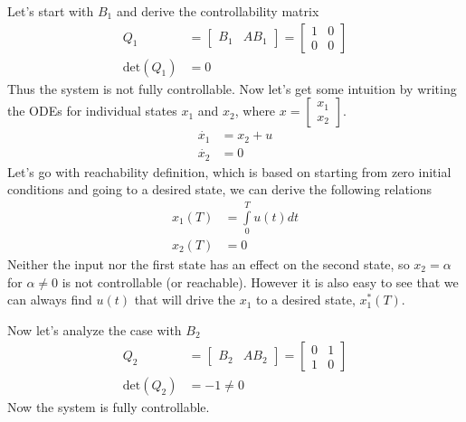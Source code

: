 \documentclass[twoside]{article}
\begin{document}
Let's start with $B_1$ and derive the controllability matrix
%
\begin{align*}
 Q_1 &= \left[ \begin{array}{cc} B_1 & A B_1 \end{array}
                                               \right]
= \left[ \begin{array}{cc} 1 & 0 \\ 0 & 0 \end{array} \right]
\\
\mathrm{det} ( Q_1) &= 0 
\end{align*}
% 
Thus the system is not fully controllable. Now let's get some
intuition by writing the ODEs for individual states $x_1$ and $x_2$,
where $x = \left[ \begin{array}{c} x_1 \\ x_2 \end{array} \right] $.
%
\begin{align*}
  \dot{x_1} &= x_2 + u
              \\
  \dot{x_2} &= 0
\end{align*}
%
Let's go with reachability definition, which is based on starting
from zero initial conditions and going to a desired state,
we can derive the following relations
%
\begin{align*}
  x_1(T) &= \int\limits_{0}^T u(t) d t
              \\
  x_2(T) &= 0
\end{align*}
%
Neither the input nor the first state has an effect on
the second state, so $x_2 = \alpha$ for $\alpha \neq 0$
is not controllable (or reachable). However it is also easy to 
see that we can always find $u(t)$ that will drive the $x_1$ to a
desired state, $x_1^*(T)$.

Now let's analyze the case with $B_2$ 
%
\begin{align*}
 Q_2 &= \left[ \begin{array}{cc} B_2 & A B_2 \end{array}
                                               \right]
= \left[ \begin{array}{cc} 0 & 1 \\ 1 & 0 \end{array} \right]
\\
\mathrm{det} ( Q_2) &= -1 \neq 0
\end{align*}
% 
Now the system is fully controllable. 

\vspace{6pt}
\end{document}
